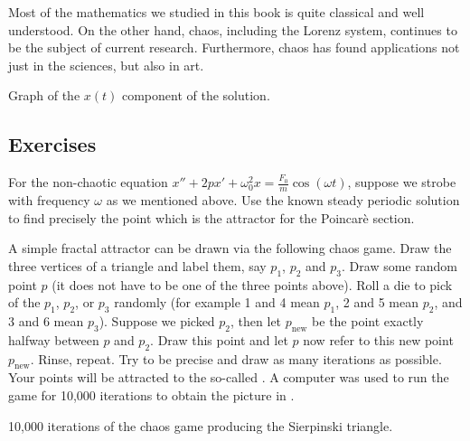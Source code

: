 Most of the mathematics we studied in this book is quite classical and
well understood.
On the other hand, chaos, including the Lorenz system, continues to be the
subject of current research.
Furthermore, chaos has found applications not just in the sciences, but
also in art.

\begin{myfig}
\capstart
{}
\caption{Graph of the $x(t)$ component of the solution.
\label{nlin:lorenz-graphx}}
\end{myfig}

\subsection{Exercises}

\begin{samepage}
\begin{exercise}
For the non-chaotic equation
$x''+2p x' + \omega_0^2 x = \frac{F_0}{m} \cos (\omega t)$, suppose we
strobe with frequency $\omega$ as we mentioned above.  Use the known
steady periodic solution to find precisely the point which is the attractor
for the Poincar\`e section.
\end{exercise}
\end{samepage}

\begin{exercise}[project]
A simple fractal attractor can be drawn via the following chaos game.  Draw
the three
vertices of a triangle and label them, say $p_1$, $p_2$
and $p_3$.  Draw some
random point $p$ (it does not have to be one of the three points above).
Roll a die to pick of the $p_1$, $p_2$, or $p_3$
randomly (for example 1 and 4 mean $p_1$, 2 and 5 mean $p_2$, and 3 and 6
mean $p_3$).  Suppose we picked $p_2$, then let $p_{\text{new}}$ be the
point exactly halfway between $p$ and $p_2$.  Draw this point and let $p$
now refer to this new point $p_{\text{new}}$.  Rinse, repeat.  Try to be
precise and draw as many iterations as possible.  Your points will be
attracted to the so-called \emph{}.  A computer
was used to run the game for 10,000 iterations to obtain the picture in
.
\end{exercise}

\begin{myfig}
\capstart
{}
\caption{10,000 iterations of the chaos game producing the 
Sierpinski triangle. \label{nlin:sierpinski}}
\end{myfig}

